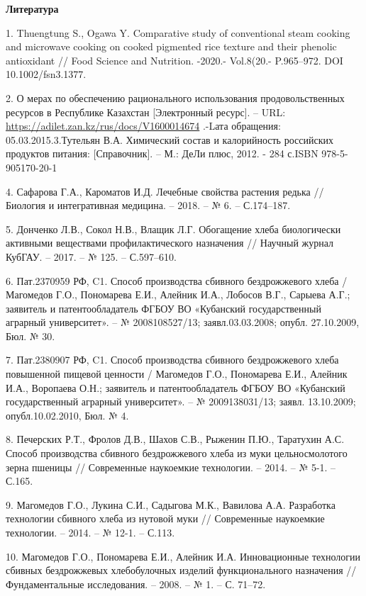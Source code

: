 \begin{center}
{\bfseries Литература}
\end{center}

\begin{references}
1. Thuengtung S., Ogawa Y. Comparative study of conventional steam
cooking and microwave cooking on cooked pigmented rice texture and their
phenolic antioxidant // Food Science and Nutrition. -2020.- Vol.8(20.-
P.965--972. DOI 10.1002/fsn3.1377.

2. О мерах по обеспечению рационального использования продовольственных
ресурсов в Республике Казахстан {[}Электронный ресурс{]}. -- URL:
\url{https://adilet.zan.kz/rus/docs/V1600014674} .-Lата обращения:
05.03.2015.3.Тутельян В.А. Химический состав и калорийность российских продуктов
питания: {[}Справочник{]}. -- М.: ДеЛи плюс, 2012. - 284 с.ISBN
978-5-905170-20-1

4. Сафарова Г.А., Кароматов И.Д. Лечебные свойства растения редька //
Биология и интегративная медицина. -- 2018. -- № 6. -- С.174--187.

5. Донченко Л.В., Сокол Н.В., Влащик Л.Г. Обогащение хлеба биологически
активными веществами профилактического назначения // Научный журнал
КубГАУ. -- 2017. -- № 125. -- С.597--610.

6. Пат.2370959 РФ, C1. Способ производства сбивного бездрожжевого хлеба
/ Магомедов Г.О., Пономарева Е.И., Алейник И.А., Лобосов В.Г., Сарыева
А.Г.; заявитель и патентообладатель ФГБОУ ВО «Кубанский государственный
аграрный университет». -- № 2008108527/13; заявл.03.03.2008; опубл.
27.10.2009, Бюл. № 30.

7. Пат.2380907 РФ, C1. Способ производства сбивного бездрожжевого хлеба
повышенной пищевой ценности / Магомедов Г.О., Пономарева Е.И., Алейник
И.А., Воропаева О.Н.; заявитель и патентообладатель ФГБОУ ВО «Кубанский
государственный аграрный университет». -- № 2009138031/13; заявл.
13.10.2009; опубл.10.02.2010, Бюл. № 4.

8. Печерских Р.Т., Фролов Д.В., Шахов С.В., Рыженин П.Ю., Таратухин А.С.
Способ производства сбивного бездрожжевого хлеба из муки цельносмолотого
зерна пшеницы // Современные наукоемкие технологии. -- 2014. -- № 5-1.
-- С.165.

9. Магомедов Г.О., Лукина С.И., Садыгова М.К., Вавилова А.А. Разработка
технологии сбивного хлеба из нутовой муки // Современные наукоемкие
технологии. -- 2014. -- № 12-1. -- С.113.

10. Магомедов Г.О., Пономарева Е.И., Алейник И.А. Инновационные
технологии сбивных бездрожжевых хлебобулочных изделий функционального
назначения // Фундаментальные исследования. -- 2008. -- № 1. -- С.
71--72.


\end{references}
